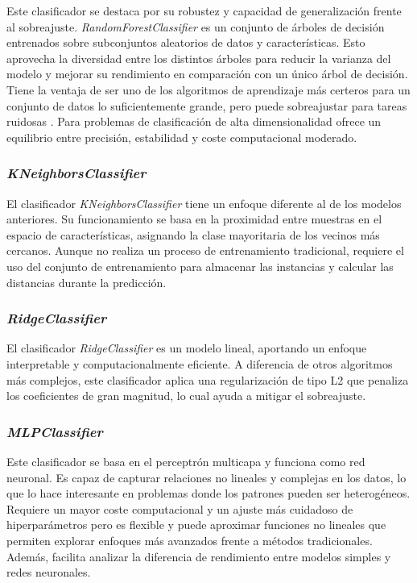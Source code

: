 Este clasificador se destaca por su robustez y capacidad de generalización frente al sobreajuste. \textit{RandomForestClassifier} es un conjunto de árboles de decisión entrenados sobre subconjuntos aleatorios de datos y características. Esto aprovecha la diversidad entre los distintos árboles para reducir la varianza del modelo y mejorar su rendimiento en comparación con un único árbol de decisión. Tiene la ventaja de ser uno de los algoritmos de aprendizaje más certeros para un conjunto de datos lo suficientemente grande, pero puede sobreajustar para tareas ruidosas \cite{rf}. Para problemas de clasificación de alta dimensionalidad ofrece un equilibrio entre precisión, estabilidad y coste computacional moderado.

\subsubsection{\textit{KNeighborsClassifier}}
\label{subsubsec:kneighborsclassifier}

El clasificador \textit{KNeighborsClassifier} tiene un enfoque diferente al de los modelos anteriores. Su funcionamiento se basa en la proximidad entre muestras en el espacio de características, asignando la clase mayoritaria de los vecinos más cercanos. Aunque no realiza un proceso de entrenamiento tradicional, requiere el uso del conjunto de entrenamiento para almacenar las instancias y calcular las distancias durante la predicción.

\newpage
\subsubsection{\textit{RidgeClassifier}}
\label{subsubsec:ridgeclassifier}

El clasificador \textit{RidgeClassifier} es un modelo lineal, aportando un enfoque interpretable y computacionalmente eficiente. A diferencia de otros algoritmos más complejos, este clasificador aplica una regularización de tipo L2 que penaliza los coeficientes de gran magnitud, lo cual ayuda a mitigar el sobreajuste.

\subsubsection{\textit{MLPClassifier}}
\label{subsubsec:mlpclassifier}

Este clasificador se basa en el perceptrón multicapa y funciona como red neuronal. Es capaz de capturar relaciones no lineales y complejas en los datos, lo que lo hace interesante en problemas donde los patrones pueden ser heterogéneos. Requiere un mayor coste computacional y un ajuste más cuidadoso de hiperparámetros pero es flexible y puede aproximar funciones no lineales que permiten explorar enfoques más avanzados frente a métodos tradicionales. Además, facilita analizar la diferencia de rendimiento entre modelos simples y redes neuronales.

